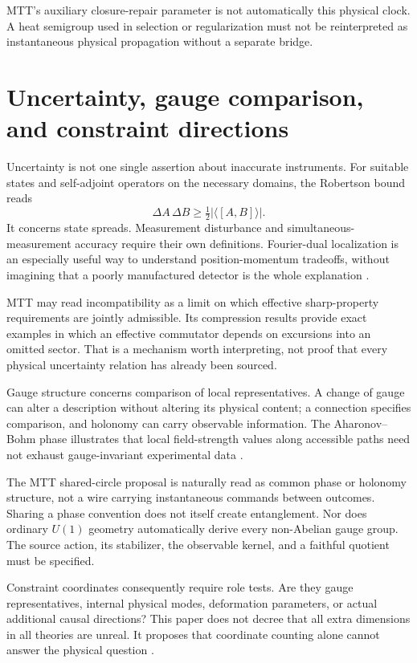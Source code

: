 \documentclass[11pt,a4paper]{article}
\begin{document}
MTT's auxiliary closure-repair parameter is not automatically this physical clock. A heat semigroup used in selection or regularization must not be reinterpreted as instantaneous physical propagation without a separate bridge.

\section{Uncertainty, gauge comparison, and constraint directions}
\label{sec:gauge}
Uncertainty is not one single assertion about inaccurate instruments. For suitable states and self-adjoint operators on the necessary domains, the Robertson bound reads
\begin{equation}
\Delta A\,\Delta B\geq\tfrac12|\langle[A,B]\rangle|.
\end{equation}
It concerns state spreads. Measurement disturbance and simultaneous-measurement accuracy require their own definitions. Fourier-dual localization is an especially useful way to understand position-momentum tradeoffs, without imagining that a poorly manufactured detector is the whole explanation \cite{Robertson}.

MTT may read incompatibility as a limit on which effective sharp-property requirements are jointly admissible. Its compression results provide exact examples in which an effective commutator depends on excursions into an omitted sector. That is a mechanism worth interpreting, not proof that every physical uncertainty relation has already been sourced.

Gauge structure concerns comparison of local representatives. A change of gauge can alter a description without altering its physical content; a connection specifies comparison, and holonomy can carry observable information. The Aharonov--Bohm phase illustrates that local field-strength values along accessible paths need not exhaust gauge-invariant experimental data \cite{AharonovBohm}.

The MTT shared-circle proposal is naturally read as common phase or holonomy structure, not a wire carrying instantaneous commands between outcomes. Sharing a phase convention does not itself create entanglement. Nor does ordinary \(U(1)\) geometry automatically derive every non-Abelian gauge group. The source action, its stabilizer, the observable kernel, and a faithful quotient must be specified.

Constraint coordinates consequently require role tests. Are they gauge representatives, internal physical modes, deformation parameters, or actual additional causal directions? This paper does not decree that all extra dimensions in all theories are unreal. It proposes that coordinate counting alone cannot answer the physical question \cite{NeroConstraint,NeroFoundation}.
\end{document}
